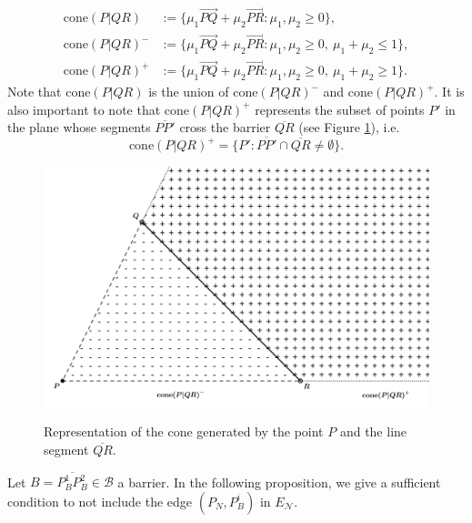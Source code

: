\documentclass[a4paper,  review, authoryear, 1p.]{elsarticle}
\newcommand{\EN}{{E^{}_{\mathcal N}}}
\newcommand{\segment}[2]{\overline{#1#2}}
\begin{document}
	\begin{align*}
		\text{cone}(P|QR)&:=\{\mu_1 \overrightarrow{PQ}+\mu_2\overrightarrow{PR}:\mu_1,\mu_2\geq 0\},\\
		\text{cone}(P|QR)^-&:=\{\mu_1 \overrightarrow{PQ}+\mu_2\overrightarrow{PR}:\mu_1,\mu_2\geq 0,\:\mu_1+\mu_2\leq 1\},\\
		\text{cone}(P|QR)^+&:=\{\mu_1 \overrightarrow{PQ}+\mu_2\overrightarrow{PR}:\mu_1,\mu_2\geq 0,\:\mu_1+\mu_2\geq 1\}.
	\end{align*}
	Note that $\text{cone}(P|QR)$ is the union of $\text{cone}(P|QR)^-$ and $\text{cone}(P|QR)^+$. It is also important to note that $\text{cone}(P|QR)^+$ represents the subset of points $P'$ in the plane whose segments $\segment{P}{P'}$ cross the barrier $\overline{QR}$ (see Figure \ref{fig:cones}), i.e.
	$$\text{cone}(P|QR)^+=\{P':\overline{PP'}\cap\overline{QR}\neq\emptyset\}.$$
	
	\begin{figure}[h!]
		\caption{Representation of the cone generated by the point $P$ and the line segment $\segment{Q}{R}$.}
		\centering
		\includegraphics[width=0.75\linewidth]{figures/cones}
		\label{fig:cones}
	\end{figure}
	Let $B = \overline{P^1_BP^2_B}\in\mathcal B$ a barrier. In the following proposition, we give a sufficient condition to not include the edge $(P^{}_N, P^i_B)$ in $\EN$.
	
\end{document}
